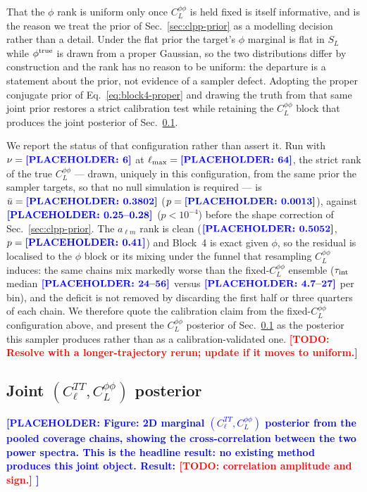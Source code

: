 \documentclass[twocolumn,superscriptaddress,aps,prl,floatfix]{revtex4-2}
\newcommand{\alm}{a_{\ell m}}
\newcommand{\cl}{C_\ell}
\newcommand{\clpp}{C_L^{\phi\phi}}
\newcommand{\lmax}{\ell_{\max}}
\newcommand{\todo}[1]{\textcolor{red}{\textbf{[TODO: #1]}}}
\newcommand{\placeholder}[1]{\textcolor{blue}{\textbf{[PLACEHOLDER: #1]}}}
\begin{document}
That the $\phi$ rank is uniform only once $\clpp$ is held fixed is itself
informative, and is the reason we treat the prior of Sec.~\ref{sec:clpp-prior}
as a modelling decision rather than a detail. Under the flat prior the target's
$\phi$ marginal is flat in $S_L$ while $\phi^{\rm true}$ is drawn from a proper
Gaussian, so the two distributions differ by construction and the rank has no
reason to be uniform: the departure is a statement about the prior, not
evidence of a sampler defect. Adopting the proper conjugate prior of
Eq.~\eqref{eq:block4-proper} and drawing the truth from that same joint prior
restores a strict calibration test while retaining the $\clpp$ block that
produces the joint posterior of Sec.~\ref{sec:joint-posterior}.

We report the status of that configuration rather than assert it. Run with
$\nu = \placeholder{6}$ at $\lmax = \placeholder{64}$, the strict rank of
the true $\clpp$ --- drawn, uniquely in this configuration, from the same
prior the sampler targets, so that no null simulation is required --- is
$\bar u = \placeholder{0.3802}$ ($p = \placeholder{0.0013}$), against
$\placeholder{0.25\text{--}0.28}$ ($p < 10^{-4}$) before the shape correction
of Sec.~\ref{sec:clpp-prior}. The $\alm$ rank is clean
($\placeholder{0.5052}$, $p = \placeholder{0.41}$) and Block~4 is exact given
$\phi$, so the residual is localised to the $\phi$ block or its mixing under
the funnel that resampling $\clpp$ induces: the same chains mix markedly worse
than the fixed-$\clpp$ ensemble ($\tau_{\rm int}$ median
$\placeholder{24\text{--}56}$ versus $\placeholder{4.7\text{--}27}$ per bin),
and the deficit is not removed by discarding the first half or three quarters
of each chain. We therefore quote the calibration claim from the fixed-$\clpp$
configuration above, and present the $\clpp$ posterior of
Sec.~\ref{sec:joint-posterior} as the posterior this sampler produces rather
than as a calibration-validated one.
\todo{Resolve with a longer-trajectory rerun; update if it moves to uniform.}

\subsection{Joint $(\cl^{TT}, \clpp)$ posterior}
\label{sec:joint-posterior}

\placeholder{
Figure: 2D marginal $(\cl^{TT}, \clpp)$ posterior from the pooled coverage
chains, showing the cross-correlation between the two power spectra.
This is the headline result: no existing method produces this joint object.
Result: \todo{correlation amplitude and sign.}
}
\end{document}
